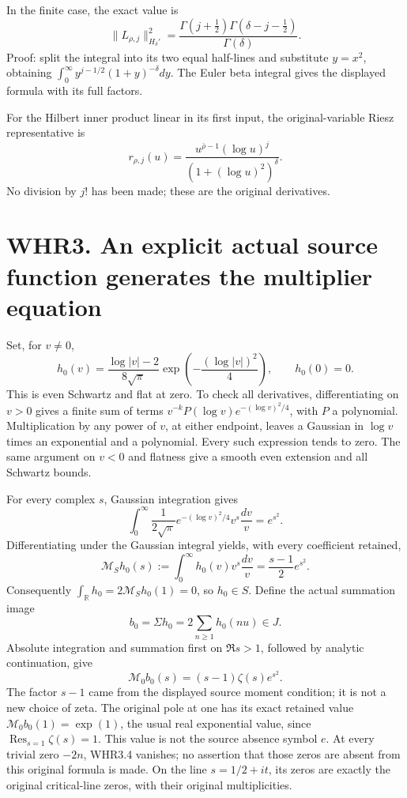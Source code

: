 In the finite case, the exact value is \[
 \|L_{\rho,j}\|_{H_\delta'}^2
 =\frac{\Gamma(j+\tfrac12)\Gamma(\delta-j-\tfrac12)}{\Gamma(\delta)}.
 \tag{WHR2.4}
\] Proof: split the integral into its two equal half-lines and
substitute \(y=x^2\), obtaining
\(\int_0^\infty y^{j-1/2}(1+y)^{-\delta}dy\). The Euler beta integral
gives the displayed formula with its full factors.

For the Hilbert inner product linear in its first input, the
original-variable Riesz representative is \[
 r_{\rho,j}(u)=
 \frac{u^{\bar\rho-1}(\log u)^j}{(1+(\log u)^2)^\delta}.
 \tag{WHR2.5}
\] No division by \(j!\) has been made; these are the original
derivatives.

\section{WHR3. An explicit actual source function generates the
multiplier
equation}\label{whr3.-an-explicit-actual-source-function-generates-the-multiplier-equation}

Set, for \(v\ne0\), \[
 h_0(v)=\frac{\log|v|-2}{8\sqrt\pi}
              \exp\!\left(-\frac{(\log|v|)^2}{4}\right),
 \qquad h_0(0)=0.
 \tag{WHR3.1}
\] This is even Schwartz and flat at zero. To check all derivatives,
differentiating on \(v>0\) gives a finite sum of terms
\(v^{-k}P(\log v)e^{-(\log v)^2/4}\), with \(P\) a polynomial.
Multiplication by any power of \(v\), at either endpoint, leaves a
Gaussian in \(\log v\) times an exponential and a polynomial. Every such
expression tends to zero. The same argument on \(v<0\) and flatness give
a smooth even extension and all Schwartz bounds.

For every complex \(s\), Gaussian integration gives \[
 \int_0^\infty\frac1{2\sqrt\pi}
 e^{-(\log v)^2/4}v^s\frac{dv}{v}=e^{s^2}.
\] Differentiating under the Gaussian integral yields, with every
coefficient retained, \[
 \mathcal M_Sh_0(s)
 :=\int_0^\infty h_0(v)v^s\frac{dv}{v}
 =\frac{s-1}{2}e^{s^2}.
 \tag{WHR3.2}
\] Consequently \(\int_{\mathbb R}h_0=2\mathcal M_Sh_0(1)=0\), so
\(h_0\in S\). Define the actual summation image \[
 b_0=\Sigma h_0=2\sum_{n\geq1}h_0(nu)\in J.
 \tag{WHR3.3}
\] Absolute integration and summation first on \(\Re s>1\), followed by
analytic continuation, give \[
 \boxed{\mathcal M_0b_0(s)=(s-1)\zeta(s)e^{s^2}.}
 \tag{WHR3.4}
\] The factor \(s-1\) came from the displayed source moment condition;
it is not a new choice of zeta. The original pole at one has its exact
retained value \(\mathcal M_0b_0(1)=\exp(1)\), the usual real
exponential value, since \(\operatorname{Res}_{s=1}\zeta(s)=1\). This
value is not the source absence symbol \(e\). At every trivial zero
\(-2n\), WHR3.4 vanishes; no assertion that those zeros are absent from
this original formula is made. On the line \(s=1/2+it\), its zeros are
exactly the original critical-line zeros, with their original
multiplicities.


